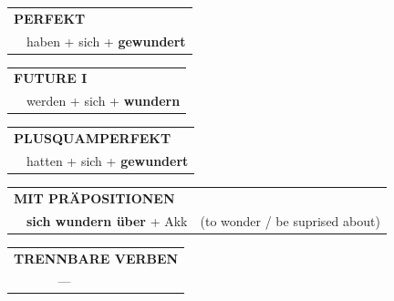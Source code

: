 \documentclass[10pt,a4paper]{revtex4-2}
\begin{document}
\begin{verbbox}
 \begin{tabular}{rl}
     \multicolumn{2}{l}{\textbf{PERFEKT}}\\
    &haben + sich + \textbf{gewundert}\\
  \end{tabular}
\hfill
   \begin{tabular}{rl}
   
    \multicolumn{2}{l}{\textbf{FUTURE I} }\\
    &werden + sich + \textbf{wundern}\\
 
  \end{tabular}
\hfill
   \begin{tabular}{rl}
      \multicolumn{2}{l}{\textbf{PLUSQUAMPERFEKT}}\\
    &hatten + sich + \textbf{gewundert}\\
  \end{tabular}
  
\vspace{10pt}

   \begin{tabular}{lll}
      \multicolumn{3}{l}{\textbf{MIT PRÄPOSITIONEN}}\\
& \textbf{sich wundern über} + Akk & (to wonder / be suprised about)
  \end{tabular}
  \hfill
  \begin{tabular}{lll}
      \multicolumn{3}{l}{\textbf{TRENNBARE VERBEN}}\\
& --- & \\
  \end{tabular}
  
  \vspace{-5pt}

\end{verbbox}
\end{document}
